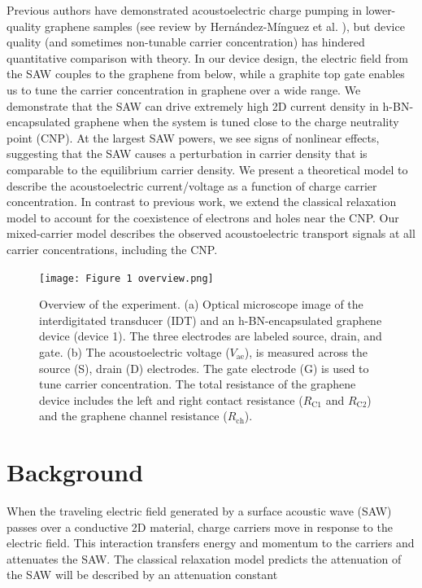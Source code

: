 \documentclass[double,12pt,1in,seploa]{beavtex}
\let\Oldsection\section
\renewcommand{\section}{\FloatBarrier\Oldsection}
\begin{document}
Previous authors have demonstrated acoustoelectric charge pumping in lower-quality graphene samples (see review by Hernández-Mínguez et al. \cite{hernandez-minguez_interaction_2018}), but device quality (and sometimes non-tunable carrier concentration) has hindered quantitative comparison with theory. In our device design, the electric field from the SAW couples to the graphene from below, while a graphite top gate enables us to tune the carrier concentration in graphene over a wide range. We demonstrate that the SAW can drive extremely high 2D current density in h-BN-encapsulated graphene when the system is tuned close to the charge neutrality point (CNP). At the largest SAW powers, we see signs of nonlinear effects, suggesting that the SAW causes a perturbation in carrier density that is comparable to the equilibrium carrier density.  We present a theoretical model to describe the acoustoelectric current/voltage as a function of charge carrier concentration. In contrast to previous work, we extend the classical relaxation model to account for the coexistence of electrons and holes near the CNP. Our mixed-carrier model describes the observed acoustoelectric transport signals at all carrier concentrations, including the CNP.

\begin{figure}
    \texttt{[image: Figure 1 overview.png]}
    \caption{Overview of the experiment. (a) Optical microscope image of the interdigitated transducer (IDT) and an h-BN-encapsulated graphene device (device 1). The three electrodes are labeled source, drain, and gate. (b) The acoustoelectric voltage ($V_{\mathrm{ae}}$), is measured across the source (S), drain (D) electrodes. The gate electrode (G) is used to tune carrier concentration. The total resistance of the graphene device includes the left and right contact resistance ($R_{\mathrm{C1}}$  and $R_{\mathrm{C2}}$) and the graphene channel resistance ($R_{\mathrm{ch}}$).}
    \label{AECP Figure 1}
\end{figure}
\section{Background}

When the traveling electric field generated by a surface acoustic wave (SAW) passes over a conductive 2D material, charge carriers move in response to the electric field. This interaction transfers energy and momentum to the carriers and attenuates the SAW. The classical relaxation model predicts the attenuation of the SAW will be described by an attenuation constant \cite{wixforth_surface_1989}
\end{document}
